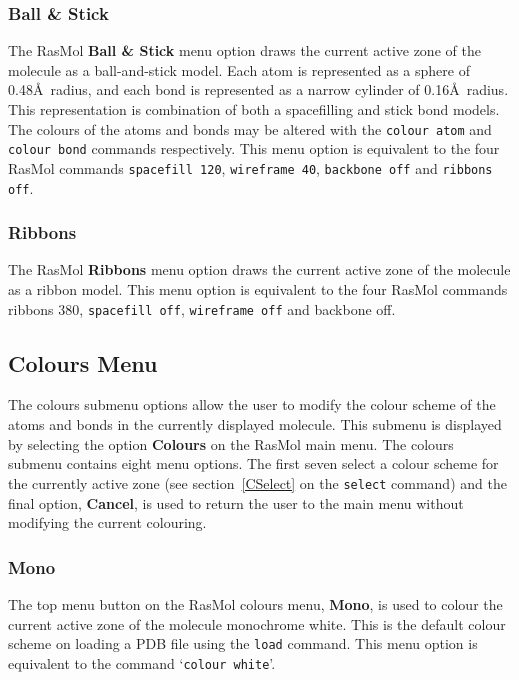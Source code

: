\subsubsection{Ball \& Stick}
\label{OBallStick}
The RasMol {\bf Ball \& Stick} menu option draws the current active zone of 
the molecule as a ball-and-stick model.  Each atom is represented as a 
sphere of 0.48\AA\ radius, and each bond is represented as a narrow cylinder 
of 0.16\AA\ radius. This representation is combination of both a spacefilling 
and stick bond models. The colours of the atoms and bonds may be altered with
the {\tt colour atom} and {\tt colour bond} commands respectively. This menu 
option is equivalent to the four RasMol commands {\tt spacefill 120}, 
{\tt wireframe 40}, {\tt backbone off} and {\tt ribbons off}.

\subsubsection{Ribbons}
\label{ORibbons}
The RasMol {\bf Ribbons} menu option draws the current active zone of the
molecule as a ribbon model. This menu option is equivalent to the four
RasMol commands {ribbons 380}, {\tt spacefill off}, {\tt wireframe off}
and {backbone off}.


\subsection{Colours Menu}
\label{OColours}
The colours submenu options allow the user to modify the colour scheme of 
the atoms and bonds in the currently displayed molecule. This submenu is
displayed by selecting the option {\bf Colours} on the RasMol main menu.
The colours submenu contains eight menu options. The first seven select a
colour scheme for the currently active zone (see section~\ref{CSelect} on
the {\tt select} command) and the final option, {\bf Cancel}, is used to 
return the user to the main menu without modifying the current colouring.

\subsubsection{Mono}
\label{OMono}
The top menu button on the RasMol colours menu, {\bf Mono}, is used to
colour the current active zone of the molecule monochrome white. This is
the default colour scheme on loading a PDB file using the {\tt load}
command. This menu option is equivalent to the command `{\tt colour white}'.

